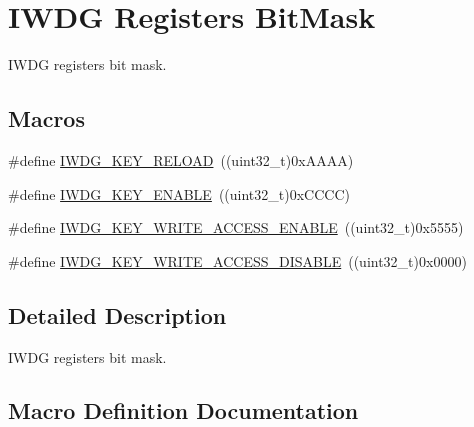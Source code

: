 \hypertarget{group___i_w_d_g___registers___bit_mask}{}\section{I\+W\+DG Registers Bit\+Mask}
\label{group___i_w_d_g___registers___bit_mask}


I\+W\+DG registers bit mask.  


\subsection*{Macros}
\begin{DoxyCompactItemize}
\item 
\#define \hyperlink{group___i_w_d_g___registers___bit_mask_ga33abf7b7c76dfda6b6380448a1d28966}{I\+W\+D\+G\+\_\+\+K\+E\+Y\+\_\+\+R\+E\+L\+O\+AD}~((uint32\+\_\+t)0x\+A\+A\+A\+A)
\item 
\#define \hyperlink{group___i_w_d_g___registers___bit_mask_ga493295d56bb62752982234755612386f}{I\+W\+D\+G\+\_\+\+K\+E\+Y\+\_\+\+E\+N\+A\+B\+LE}~((uint32\+\_\+t)0x\+C\+C\+C\+C)
\item 
\#define \hyperlink{group___i_w_d_g___registers___bit_mask_ga90fbb0a5e42ed25b44c0330ad75724e6}{I\+W\+D\+G\+\_\+\+K\+E\+Y\+\_\+\+W\+R\+I\+T\+E\+\_\+\+A\+C\+C\+E\+S\+S\+\_\+\+E\+N\+A\+B\+LE}~((uint32\+\_\+t)0x5555)
\item 
\#define \hyperlink{group___i_w_d_g___registers___bit_mask_ga9e63bed9af448ad96c4621e74230a415}{I\+W\+D\+G\+\_\+\+K\+E\+Y\+\_\+\+W\+R\+I\+T\+E\+\_\+\+A\+C\+C\+E\+S\+S\+\_\+\+D\+I\+S\+A\+B\+LE}~((uint32\+\_\+t)0x0000)
\end{DoxyCompactItemize}


\subsection{Detailed Description}
I\+W\+DG registers bit mask. 



\subsection{Macro Definition Documentation}
